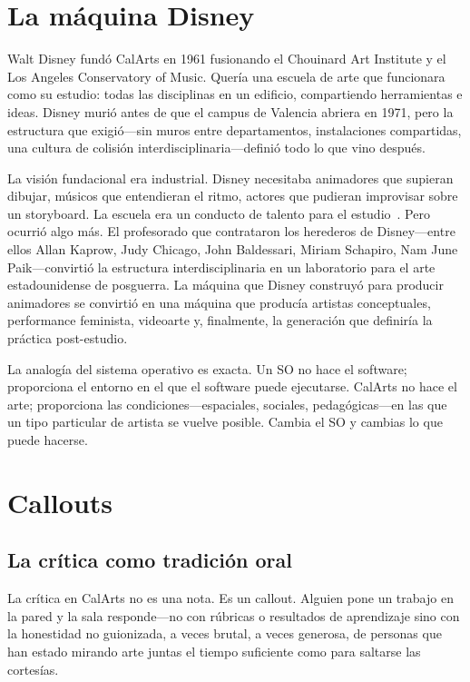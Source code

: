 \documentclass[10pt,letterpaper,twocolumn]{article}
\begin{document}
\section{La máquina Disney}

Walt Disney fundó CalArts en 1961 fusionando el Chouinard Art Institute y el Los Angeles Conservatory of Music. Quería una escuela de arte que funcionara como su estudio: todas las disciplinas en un edificio, compartiendo herramientas e ideas. Disney murió antes de que el campus de Valencia abriera en 1971, pero la estructura que exigió---sin muros entre departamentos, instalaciones compartidas, una cultura de colisión interdisciplinaria---definió todo lo que vino después.

La visión fundacional era industrial. Disney necesitaba animadores que supieran dibujar, músicos que entendieran el ritmo, actores que pudieran improvisar sobre un storyboard. La escuela era un conducto de talento para el estudio~\citep{singerman1999art}. Pero ocurrió algo más. El profesorado que contrataron los herederos de Disney---entre ellos Allan Kaprow, Judy Chicago, John Baldessari, Miriam Schapiro, Nam June Paik---convirtió la estructura interdisciplinaria en un laboratorio para el arte estadounidense de posguerra. La máquina que Disney construyó para producir animadores se convirtió en una máquina que producía artistas conceptuales, performance feminista, videoarte y, finalmente, la generación que definiría la práctica post-estudio.

La analogía del sistema operativo es exacta. Un SO no hace el software; proporciona el entorno en el que el software puede ejecutarse. CalArts no hace el arte; proporciona las condiciones---espaciales, sociales, pedagógicas---en las que un tipo particular de artista se vuelve posible. Cambia el SO y cambias lo que puede hacerse.

\section{Callouts}

\subsection{La crítica como tradición oral}

La crítica en CalArts no es una nota. Es un callout. Alguien pone un trabajo en la pared y la sala responde---no con rúbricas o resultados de aprendizaje sino con la honestidad no guionizada, a veces brutal, a veces generosa, de personas que han estado mirando arte juntas el tiempo suficiente como para saltarse las cortesías.
\end{document}
